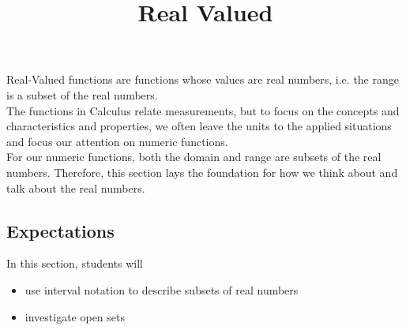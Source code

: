 \documentclass{ximera}
\title{Real Valued}
\begin{document}
\begin{abstract}
\end{abstract}
\maketitle





Real-Valued functions are functions whose values are real numbers, i.e. the range is a subset of the real numbers. \\


The functions in Calculus relate measurements, but to focus on the concepts and characteristics and properties, we often leave the units to the applied situations and focus our attention on numeric functions. \\


For our numeric functions, both the domain and range are subsets of the real numbers. Therefore, this section lays the foundation for how we think about and talk about the real numbers.










\subsection{Expectations}





\begin{sectionOutcomes}
In this section, students will 

\begin{itemize}
\item use interval notation to describe subsets of real numbers
\item investigate open sets
\end{itemize}
\end{sectionOutcomes}
\end{document}
